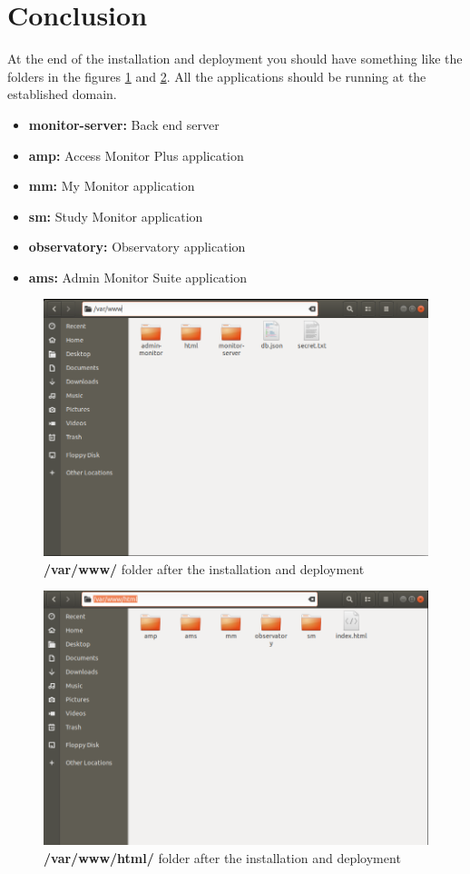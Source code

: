 \section{Conclusion}

At the end of the installation and deployment you should have something like the folders in the figures \ref{fig:var_www_folder} and \ref{fig:var_www_html_folder}. All the applications should be running at the established domain.

\begin{itemize}
    \item \textbf{monitor-server:} Back end server
    \item \textbf{amp:} Access Monitor Plus application
    \item \textbf{mm:} My Monitor application
    \item \textbf{sm:} Study Monitor application
    \item \textbf{observatory:} Observatory application
    \item \textbf{ams:} Admin Monitor Suite application
\end{itemize}

\begin{figure}[ht]
    \centering
    \includegraphics[width=\linewidth]{lib/images/conclusion/var_www_folder.png}
    \caption{\textbf{/var/www/} folder after the installation and deployment}
    \label{fig:var_www_folder}
\end{figure}

\begin{figure}[ht]
    \centering
    \includegraphics[width=\linewidth]{lib/images/conclusion/var_www_html_folder.png}
    \caption{\textbf{/var/www/html/} folder after the installation and deployment}
    \label{fig:var_www_html_folder}
\end{figure}
